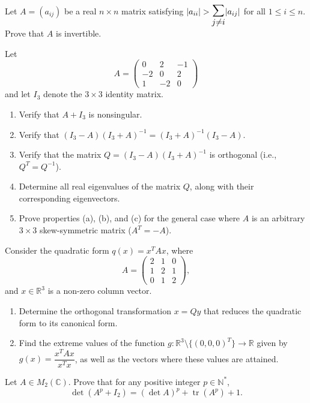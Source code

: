 \documentclass[12pt]{article}
\let\oldsum\sum
\renewcommand{\sum}{\mathlarger{\mathlarger{\oldsum}}}
\begin{document}
\begin{problem}
Let $A=(a_{ij})$ be a real $n\times n$ matrix satisfying $|a_{ii}| > \sum_{j\ne i}|a_{ij}|$ for all $1\le i\le n$. Prove that $A$ is invertible.
\end{problem}

\begin{problem}
Let
\[
A=\begin{pmatrix} 0 & 2 & -1\\ -2 & 0 & 2\\ 1 & -2 & 0\end{pmatrix}
\]
and let $I_3$ denote the $3\times 3$ identity matrix.
\begin{enumerate}[label=(\alph*)]
\item Verify that $A+I_3$ is nonsingular.
\item Verify that $(I_3-A)(I_3+A)^{-1} = (I_3+A)^{-1}(I_3-A)$.
\item Verify that the matrix $Q=(I_3-A)(I_3+A)^{-1}$ is orthogonal (i.e., $Q^T=Q^{-1}$).
\item Determine all real eigenvalues of the matrix $Q$, along with their corresponding eigenvectors.
\item Prove properties (a), (b), and (c) for the general case where $A$ is an arbitrary $3\times 3$ skew-symmetric matrix ($A^T=-A$).
\end{enumerate}
\end{problem}

\begin{problem}
Consider the quadratic form $q(x)=x^TAx$, where
\[
A=\begin{pmatrix} 2 & 1 & 0\\ 1 & 2 & 1\\ 0 & 1 & 2\end{pmatrix},
\]
and $x\in\mathbb{R}^3$ is a non-zero column vector.
\begin{enumerate}[label=(\alph*)]
\item Determine the orthogonal transformation $x=Qy$ that reduces the quadratic form to its canonical form.
\item Find the extreme values of the function $g:\mathbb{R}^3\setminus\{(0,0,0)^T\}\to\mathbb{R}$ given by $g(x)=\dfrac{x^TAx}{x^Tx}$, as well as the vectors where these values are attained.
\end{enumerate}
\end{problem}

\begin{problem}
Let $A\in M_2(\mathbb{C})$. Prove that for any positive integer $p\in\mathbb{N}^*$,
\[
\det(A^p+I_2) = (\det A)^p + \operatorname{tr}(A^p) + 1.
\]
\end{problem}
\end{document}
